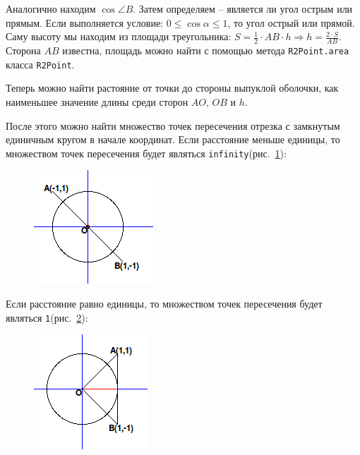 Аналогично находим $\cos\angle B$. Затем определяем -- является 
ли угол острым или прямым. Если выполняется условие: 
$0 \leqslant \cos\alpha \leqslant 1$, то угол острый или прямой. 
Саму высоту мы находим из площади треугольника: $S=\frac12\cdot 
AB\cdot h \Rightarrow h=\frac{2\cdot S}{AB}$. Сторона $AB$ известна, 
площадь можно найти с помощью метода \verb|R2Point.area| 
класса \verb|R2Point|.

Теперь можно найти растояние от точки до стороны выпуклой оболочки, 
как наименьшее значение длины среди сторон $AO$, $OB$ и $h$.

\newpage

После этого можно найти множество точек пересечения отрезка с 
замкнутым единичным кругом в начале координат. Если расстояние меньше 
единицы, то множеством точек пересечения будет являться 
\verb|infinity|(рис.~\ref{fig:ro_0}):
\begin{figure}[ht!]
\begin{center}
\includegraphics[scale=0.6]{images/ro_0}
\end{center}
\vspace*{-8mm}
\caption{}\label{fig:ro_0}
\end{figure}

Если расстояние равно единицы, то множеством точек пересечения будет 
являться \verb|1|(рис.~\ref{fig:ro_1}):
\begin{figure}[ht!]
\begin{center}
\includegraphics[scale=0.6]{images/ro_1}
\end{center}
\vspace*{-8mm}
\caption{}\label{fig:ro_1}
\end{figure}

